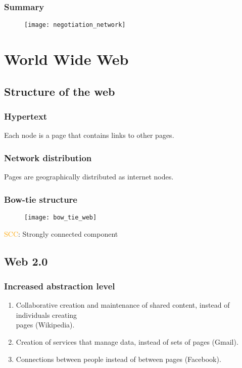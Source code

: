 \subsection{Summary}

\begin{figure}[H]
    \centering
    \texttt{[image: negotiation\_network]}
\end{figure}

\chapter{World Wide Web}

\section{Structure of the web}

\subsection{Hypertext}

Each node is a page that contains links to other pages.

\subsection{Network distribution}

Pages are geographically distributed as internet nodes.

\subsection{Bow-tie structure}

\begin{figure}[H]
    \centering
    \texttt{[image: bow\_tie\_web]}
\end{figure}

\textcolor{orange}{SCC}: Strongly connected component

\section{Web 2.0}

\subsection{Increased abstraction level}

\begin{enumerate}
\item Collaborative creation and maintenance of shared content, instead of individuals creating\\pages (Wikipedia).
\item Creation of services that manage data, instead of sets of pages (Gmail).
\item Connections between people instead of between pages (Facebook).
\end{enumerate}

